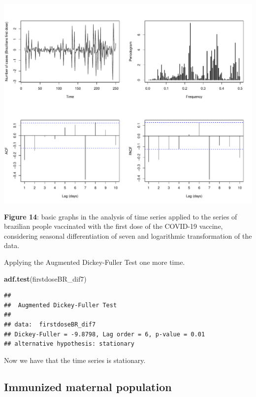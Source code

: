 \documentclass[
]{article}
\newenvironment{Shaded}{\begin{snugshade}}{\end{snugshade}}
\newcommand{\FunctionTok}[1]{\textcolor[rgb]{0.13,0.29,0.53}{\textbf{#1}}}
\newcommand{\NormalTok}[1]{#1}
\renewenvironment{Shaded}{\begin{mdframed}[ backgroundcolor=shadecolor, linecolor = shadecolor, leftmargin=\dimexpr\leftmargin-2pt\relax, innerleftmargin=1.6pt, innertopmargin=5pt, skipabove=10pt,skipbelow=3pt ]}{\end{mdframed}}
\begin{document}
\begin{center}\includegraphics[width=\linewidth]{IF_results_ENG_files/figure-latex/unnamed-chunk-16-1} \end{center}

\textbf{Figure 14}: basic graphs in the analysis of time series applied
to the series of brazilian people vaccinated with the first dose of the
COVID-19 vaccine, considering seasonal differentiation of seven and
logarithmic transformation of the data.

Applying the Augmented Dickey-Fuller Test one more time.

\begin{Shaded}
\begin{Highlighting}[]
\FunctionTok{adf.test}\NormalTok{(firstdoseBR\_dif7)}
\end{Highlighting}
\end{Shaded}

\begin{verbatim}
## 
##  Augmented Dickey-Fuller Test
## 
## data:  firstdoseBR_dif7
## Dickey-Fuller = -9.8798, Lag order = 6, p-value = 0.01
## alternative hypothesis: stationary
\end{verbatim}

Now we have that the time series is stationary.

\subsection{Immunized maternal
population}\label{immunized-maternal-population}
\end{document}
